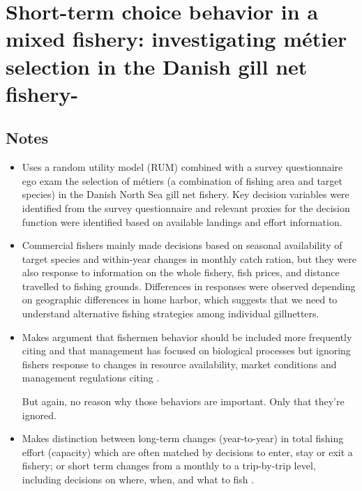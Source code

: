 \documentclass[a4paper,10pt]{report}
\begin{document}
\section*{Short-term choice behavior in a mixed fishery: investigating m\'{e}tier selection in the Danish gill net fishery- \cite{Andersenetal:2012}}

\subsection*{Notes}
\begin{itemize}
\item Uses a random utility model (RUM) combined with a survey questionnaire ego exam the selection of m\'{e}tiers (a combination of fishing area and target species) in the Danish North Sea gill net fishery. Key decision variables were identified from the survey questionnaire and relevant proxies for the decision function were identified based on available landings and effort information. 
\item Commercial fishers mainly made decisions based on seasonal availability of target species and within-year changes in monthly catch ration, but they were also response to information on the whole fishery, fish prices, and distance travelled to fishing grounds. Differences in responses were observed depending on geographic differences in home harbor, which suggests that we need to understand alternative fishing strategies among individual gillnetters.
\item Makes argument that fishermen behavior should be included more frequently citing \cite{Wilen:1979, Branchetal:2006} and that management has focused on biological processes but ignoring fishers response to changes in resource availability, market conditions and management regulations citing \cite{Hilborn:2007, SalasGaertner:2004, HilbornWalters:1992}. 

But again, no reason why those behaviors are important. Only that they're ignored. 
\item Makes distinction between long-term changes (year-to-year) in total fishing effort (capacity) which are often matched by decisions to enter, stay or exit a fishery; or short term changes from a monthly to a trip-by-trip level, including decisions on where, when, and what to fish \citep{Hilborn:1985, SalasGaertner:2004}. 


\end{itemize}
\end{document}
